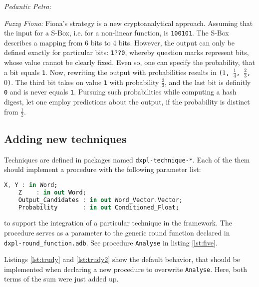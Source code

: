 \documentclass{acmtrans2m}
\begin{document}
\begin{describe}{{\em Pedantic Petra\/}:}
\item[{\em Fuzzy Fiona\/}:]
Fiona's strategy is a new cryptoanalytical approach. Assuming that
the input for a S-Box, i.e. for a non-linear function, is \texttt{100101}.
The S-Box describes a mapping from 6 bits to 4 bits. However, 
the output can only be defined exactly for particular bits: \texttt{1??0},
whereby question marks represent bits, whose value cannot be
clearly fixed. Even so, one can specify the probability, that a bit
equals \texttt{1}. Now, rewriting the output with probabilities results
in \texttt{($1$, $\frac{1}{4}$, $\frac{2}{3}$, $0$)}. The third bit 
takes on value \texttt{1} with probability $\frac{2}{3}$, and the last bit
is definitly \texttt{0} and is never equals \texttt{1}.
Pursuing such probabilities while computing a hash digest, let one
employ predictions about the output, if the probability is distinct from $\frac{1}{2}$.
\end{describe}

\subsection{Adding new techniques}
Techniques are defined in packages named \texttt{dxpl-technique-*}.
Each of the them should implement a procedure with the following parameter list:

\begin{lstlisting}[language=Ada]
    X, Y : in Word;
    Z    : in out Word;
    Output_Candidates : in out Word_Vector.Vector;
    Probability       : in out Conditioned_Float;
\end{lstlisting}

to support the integration of a particular technique in the framework. 
The procedure serves as a parameter to the generic round function 
declared in \\ \texttt{dxpl-round\_function.adb}. See procedure
\texttt{Analyse} in listing \ref{lst:five}.

Listings \ref{lst:trudy} and \ref{lst:trudy2} show the default behavior, that should be implemented
when declaring a new procedure to overwrite \texttt{Analyse}. Here,
both terms of the sum were just added up.

\vfill
\end{document}
